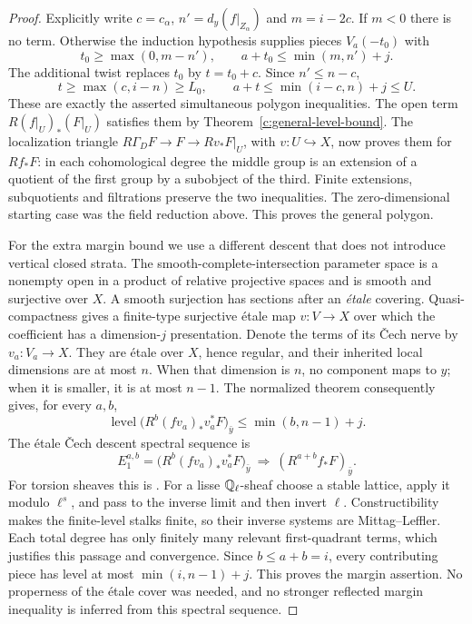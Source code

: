 \begin{proof}
Explicitly write $c=c_\alpha$, $n'=d_y(f|_{Z_\alpha})$ and $m=i-2c$. If $m<0$ there is no term. Otherwise the induction hypothesis supplies pieces $V_a(-t_0)$ with
\[
 t_0\geq\max(0,m-n'),\qquad a+t_0\leq\min(m,n')+j.
\]
The additional twist replaces $t_0$ by $t=t_0+c$. Since $n'\leq n-c$,
\[
 t\geq\max(c,i-n)\geq L_0,
 \qquad a+t\leq\min(i-c,n)+j\leq U.
\]
These are exactly the asserted simultaneous polygon inequalities. The open term $R(f|_U)_*(F|_U)$ satisfies them by Theorem~\ref{c:general-level-bound}. The localization triangle $R\Gamma_DF\to F\to Rv_*F|_U$, with $v:U\hookrightarrow X$, now proves them for $Rf_*F$: in each cohomological degree the middle group is an extension of a quotient of the first group by a subobject of the third. Finite extensions, subquotients and filtrations preserve the two inequalities. The zero-dimensional starting case was the field reduction above. This proves the general polygon.

For the extra margin bound we use a different descent that does not introduce vertical closed strata. The smooth-complete-intersection parameter space is a nonempty open in a product of relative projective spaces and is smooth and surjective over $X$. A smooth surjection has sections after an \emph{\'etale} covering. Quasi-compactness gives a finite-type surjective \'etale map $v:V\to X$ over which the coefficient has a dimension-$j$ presentation. Denote the terms of its \v Cech nerve by $v_a:V_a\to X$. They are \'etale over $X$, hence regular, and their inherited local dimensions are at most $n$. When that dimension is $n$, no component maps to $y$; when it is smaller, it is at most $n-1$. The normalized theorem consequently gives, for every $a,b$,
\[
 \operatorname{level}\bigl(R^b(fv_a)_*v_a^*F\bigr)_{\bar y}
       \leq\min(b,n-1)+j.
\]
The \'etale \v Cech descent spectral sequence is
\[
 E_1^{a,b}=\bigl(R^b(fv_a)_*v_a^*F\bigr)_{\bar y}
       \ \Longrightarrow\ (R^{a+b}f_*F)_{\bar y}.
\]
For torsion sheaves this is \citet[Proposition 96.21.1, Tag 072G; see also Theorem 59.19.2, Tag 03OW]{c_stacksdescent}. For a lisse $\mathbb Q_\ell$-sheaf choose a stable lattice, apply it modulo $\ell^s$, and pass to the inverse limit and then invert $\ell$. Constructibility makes the finite-level stalks finite, so their inverse systems are Mittag--Leffler. Each total degree has only finitely many relevant first-quadrant terms, which justifies this passage and convergence. Since $b\leq a+b=i$, every contributing piece has level at most $\min(i,n-1)+j$. This proves the margin assertion. No properness of the \'etale cover was needed, and no stronger reflected margin inequality is inferred from this spectral sequence.
\end{proof}

